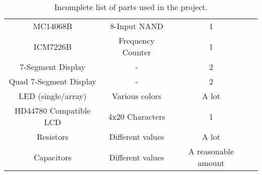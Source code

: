 \begin{table}[H]
\begin{tabular}{c|c|c|l}
    MC14068B               & 8-Input NAND & 1 &\\
    ICM7226B               & Frequency Counter & 1 &\\
    7-Segment Display      & - & 2 &\\
    Quad 7-Segment Display & - & 2 &\\
    LED (single/array)     & Various colors & A lot &\\
    HD44780 Compatible LCD & 4x20 Characters & 1 &\\
    Resistors              & Different values & A lot &\\
    Capacitors             & Different values & A reasonable amount &\\    
  \end{tabular}
  \caption{Incomplete list of parts used in the project.}
  \label{tab:parts}
\end{table}
